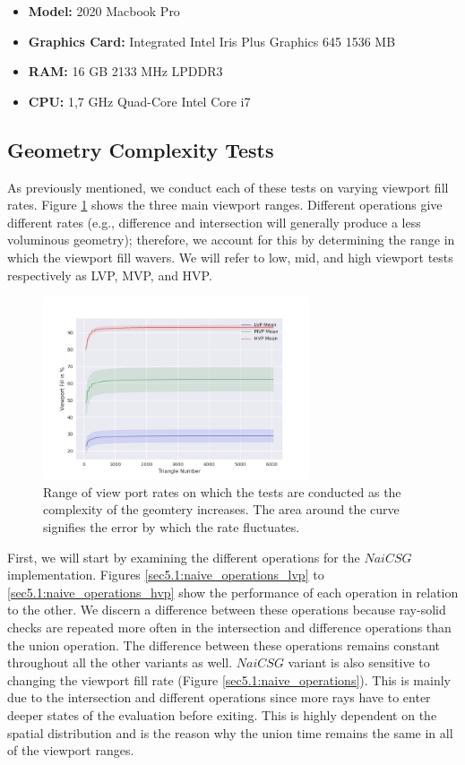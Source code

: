 \documentclass[a4paper,11pt,oneside]{article}
\begin{document}
\begin{itemize}
	\item \textbf{Model:} 2020 Macbook Pro
	\item \textbf{Graphics Card:} Integrated Intel Iris Plus Graphics 645 1536 MB
	\item \textbf{RAM:} 16 GB 2133 MHz LPDDR3
	\item \textbf{CPU:} 1,7 GHz Quad-Core Intel Core i7
\end{itemize}


\subsection{Geometry Complexity Tests}

As previously mentioned, we conduct each of these tests on varying viewport fill rates. Figure \ref{sec5.1:viewport_range} shows the three main viewport ranges. Different operations give different rates (e.g., difference and intersection will generally produce a less voluminous geometry); therefore, we account for this by determining the range in which the viewport fill wavers. We will refer to low, mid, and high viewport tests respectively as LVP, MVP, and HVP.

\begin{figure}[H] 
	\begin{center}
		\includegraphics[width=0.7\textwidth]{section5/plots/view_port_final.png}
	\end{center}
	\caption{Range of view port rates on which the tests are conducted as the complexity of the geomtery increases. The area around the curve signifies the error by which the rate fluctuates.}
	\label{sec5.1:viewport_range}
\end{figure}


First, we will start by examining the different operations for the $NaiCSG$ implementation. Figures \ref{sec5.1:naive_operations_lvp} to \ref{sec5.1:naive_operations_hvp} show the performance of each operation in relation to the other. We discern a difference between these operations because ray-solid checks are repeated more often in the intersection and difference operations than the union operation. The difference between these operations remains constant throughout all the other variants as well. $NaiCSG$ variant is also sensitive to changing the viewport fill rate (Figure \ref{sec5.1:naive_operations}). This is mainly due to the intersection and different operations since more rays have to enter deeper states of the evaluation before exiting. This is highly dependent on the spatial distribution and is the reason why the union time remains the same in all of the viewport ranges.
\end{document}
